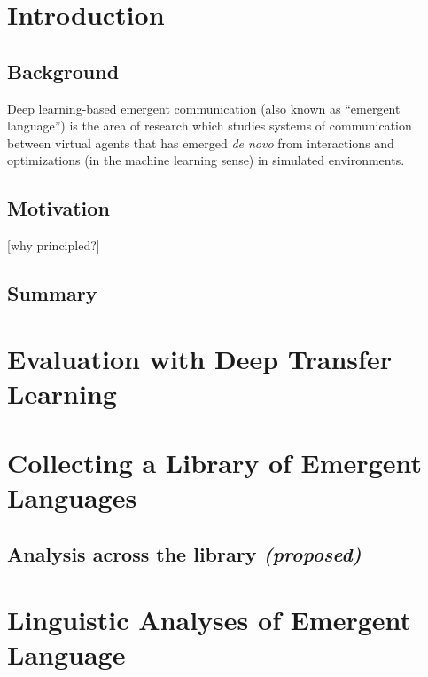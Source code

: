 





\chapter{Introduction}

\section{Background}

Deep learning-based emergent communication (also known as ``emergent language'') is the area of research which studies systems of communication between virtual agents that has emerged \emph{de novo} from interactions and optimizations (in the machine learning sense) in simulated environments.


\section{Motivation}

[why principled?]

\section{Summary}


\chapter{Evaluation with Deep Transfer Learning}

\chapter{Collecting a Library of Emergent Languages}


\section{Analysis across the library \emph{(proposed)}}


\chapter{Linguistic Analyses of Emergent Language}



